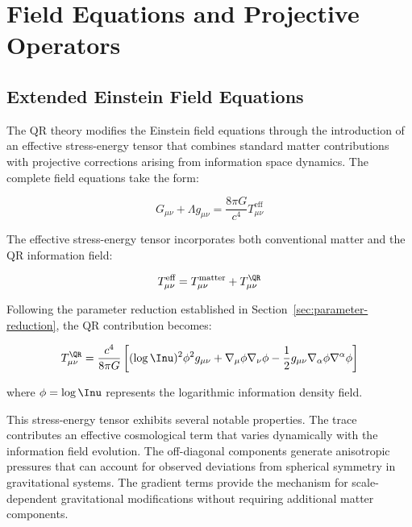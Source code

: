 \section{Field Equations and Projective Operators}
\label{sec:field-equations}

\subsection{Extended Einstein Field Equations}
\label{subsec:extended-einstein}

The QR theory modifies the Einstein field equations through the introduction of an effective stress-energy tensor that combines standard matter contributions with projective corrections arising from information space dynamics. The complete field equations take the form:

\begin{equation}
G_{\mu\nu} + \Lambda g_{\mu\nu} = \frac{8\pi G}{c^4} T_{\mu\nu}^{\text{eff}}
\label{eq:qr-field-equations}
\end{equation}

The effective stress-energy tensor incorporates both conventional matter and the QR information field:

\begin{equation}
T_{\mu\nu}^{\text{eff}} = T_{\mu\nu}^{\text{matter}} + T_{\mu\nu}^{\QR}
\label{eq:effective-tensor}
\end{equation}

Following the parameter reduction established in Section~\ref{sec:parameter-reduction}, the QR contribution becomes:

\begin{equation}
T_{\mu\nu}^{\QR} = \frac{c^4}{8\pi G} \left[ (\log \Inu)^2 \phi^2 g_{\mu\nu} + \nabla_\mu \phi \nabla_\nu \phi - \frac{1}{2} g_{\mu\nu} \nabla_\alpha \phi \nabla^\alpha \phi \right]
\label{eq:qr-stress-tensor}
\end{equation}

where $\phi = \log \Inu$ represents the logarithmic information density field.

This stress-energy tensor exhibits several notable properties. The trace contributes an effective cosmological term that varies dynamically with the information field evolution. The off-diagonal components generate anisotropic pressures that can account for observed deviations from spherical symmetry in gravitational systems. The gradient terms provide the mechanism for scale-dependent gravitational modifications without requiring additional matter components.

